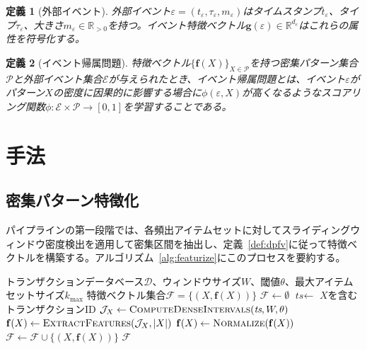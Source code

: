 \documentclass[sigconf,nonacm]{acmart}
\newtheorem{definition}{定義}
\begin{document}
\begin{definition}[外部イベント]
外部イベント$\varepsilon = (t_\varepsilon, \tau_\varepsilon, m_\varepsilon)$はタイムスタンプ$t_\varepsilon$、タイプ$\tau_\varepsilon$、大きさ$m_\varepsilon \in \mathbb{R}_{>0}$を持つ。イベント特徴ベクトル$\mathbf{g}(\varepsilon) \in \mathbb{R}^{d_e}$はこれらの属性を符号化する。
\end{definition}

\begin{definition}[イベント帰属問題]
特徴ベクトル$\{\mathbf{f}(X)\}_{X \in \mathcal{P}}$を持つ密集パターン集合$\mathcal{P}$と外部イベント集合$\mathcal{E}$が与えられたとき、\emph{イベント帰属問題}とは、イベント$\varepsilon$がパターン$X$の密度に因果的に影響する場合に$\phi(\varepsilon, X)$が高くなるようなスコアリング関数$\phi: \mathcal{E} \times \mathcal{P} \to [0, 1]$を学習することである。
\end{definition}

\section{手法}
\label{sec:method}

\subsection{密集パターン特徴化}

パイプラインの第一段階では、各頻出アイテムセットに対してスライディングウィンドウ密度検出を適用して密集区間を抽出し、定義~\ref{def:dpfv}に従って特徴ベクトルを構築する。アルゴリズム~\ref{alg:featurize}にこのプロセスを要約する。

\begin{algorithm}[t]
\caption{密集パターン特徴化}
\label{alg:featurize}
\begin{algorithmic}[1]
\REQUIRE トランザクションデータベース$\mathcal{D}$、ウィンドウサイズ$W$、閾値$\theta$、最大アイテムセットサイズ$k_{\max}$
\ENSURE 特徴ベクトル集合$\mathcal{F} = \{(X, \mathbf{f}(X))\}$
\STATE $\mathcal{F} \leftarrow \emptyset$
    \STATE $\textit{ts} \leftarrow$ $X$を含むトランザクションID
    \STATE $\mathcal{J}_X \leftarrow \textsc{ComputeDenseIntervals}(\textit{ts}, W, \theta)$
        \STATE $\mathbf{f}(X) \leftarrow \textsc{ExtractFeatures}(\mathcal{J}_X, |X|)$
        \STATE $\mathbf{f}(X) \leftarrow \textsc{Normalize}(\mathbf{f}(X))$ 
        \STATE $\mathcal{F} \leftarrow \mathcal{F} \cup \{(X, \mathbf{f}(X))\}$
    \ENDIF
\ENDFOR
\RETURN $\mathcal{F}$
\end{algorithmic}
\end{algorithm}
\end{document}
